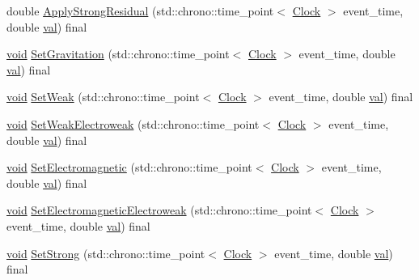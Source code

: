 \begin{DoxyCompactItemize}
\item 
double \mbox{\hyperlink{class_monomer_a921f7add2d446b8670513220ace6c4b2}{Apply\+Strong\+Residual}} (std\+::chrono\+::time\+\_\+point$<$ \mbox{\hyperlink{universe_8h_a0ef8d951d1ca5ab3cfaf7ab4c7a6fd80}{Clock}} $>$ event\+\_\+time, double \mbox{\hyperlink{glad_8h_a26942fd2ed566ef553eae82d2c109c8f}{val}}) final
\item 
\mbox{\hyperlink{glad_8h_a950fc91edb4504f62f1c577bf4727c29}{void}} \mbox{\hyperlink{class_monomer_ab38d44b27a46d5630aeb5e889f927c09}{Set\+Gravitation}} (std\+::chrono\+::time\+\_\+point$<$ \mbox{\hyperlink{universe_8h_a0ef8d951d1ca5ab3cfaf7ab4c7a6fd80}{Clock}} $>$ event\+\_\+time, double \mbox{\hyperlink{glad_8h_a26942fd2ed566ef553eae82d2c109c8f}{val}}) final
\item 
\mbox{\hyperlink{glad_8h_a950fc91edb4504f62f1c577bf4727c29}{void}} \mbox{\hyperlink{class_monomer_ad4fe1db33f493575281e1a2fb35004ca}{Set\+Weak}} (std\+::chrono\+::time\+\_\+point$<$ \mbox{\hyperlink{universe_8h_a0ef8d951d1ca5ab3cfaf7ab4c7a6fd80}{Clock}} $>$ event\+\_\+time, double \mbox{\hyperlink{glad_8h_a26942fd2ed566ef553eae82d2c109c8f}{val}}) final
\item 
\mbox{\hyperlink{glad_8h_a950fc91edb4504f62f1c577bf4727c29}{void}} \mbox{\hyperlink{class_monomer_ab887d7cfd2ecb557efb3ace59852019c}{Set\+Weak\+Electroweak}} (std\+::chrono\+::time\+\_\+point$<$ \mbox{\hyperlink{universe_8h_a0ef8d951d1ca5ab3cfaf7ab4c7a6fd80}{Clock}} $>$ event\+\_\+time, double \mbox{\hyperlink{glad_8h_a26942fd2ed566ef553eae82d2c109c8f}{val}}) final
\item 
\mbox{\hyperlink{glad_8h_a950fc91edb4504f62f1c577bf4727c29}{void}} \mbox{\hyperlink{class_monomer_a50e41be601b31450a97bfd15950cfb3d}{Set\+Electromagnetic}} (std\+::chrono\+::time\+\_\+point$<$ \mbox{\hyperlink{universe_8h_a0ef8d951d1ca5ab3cfaf7ab4c7a6fd80}{Clock}} $>$ event\+\_\+time, double \mbox{\hyperlink{glad_8h_a26942fd2ed566ef553eae82d2c109c8f}{val}}) final
\item 
\mbox{\hyperlink{glad_8h_a950fc91edb4504f62f1c577bf4727c29}{void}} \mbox{\hyperlink{class_monomer_aa034728b74053ed3df452ddc8f1b46e8}{Set\+Electromagnetic\+Electroweak}} (std\+::chrono\+::time\+\_\+point$<$ \mbox{\hyperlink{universe_8h_a0ef8d951d1ca5ab3cfaf7ab4c7a6fd80}{Clock}} $>$ event\+\_\+time, double \mbox{\hyperlink{glad_8h_a26942fd2ed566ef553eae82d2c109c8f}{val}}) final
\item 
\mbox{\hyperlink{glad_8h_a950fc91edb4504f62f1c577bf4727c29}{void}} \mbox{\hyperlink{class_monomer_a10b864f6bcad43f11a2316dbbe4c4742}{Set\+Strong}} (std\+::chrono\+::time\+\_\+point$<$ \mbox{\hyperlink{universe_8h_a0ef8d951d1ca5ab3cfaf7ab4c7a6fd80}{Clock}} $>$ event\+\_\+time, double \mbox{\hyperlink{glad_8h_a26942fd2ed566ef553eae82d2c109c8f}{val}}) final

\end{DoxyCompactItemize}
